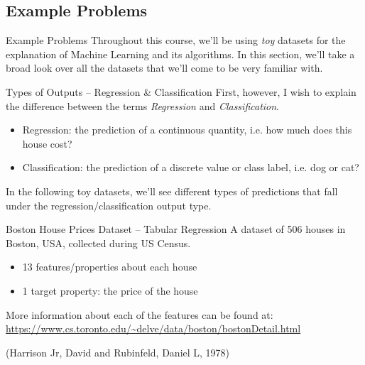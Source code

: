 \documentclass[10pt]{beamer}
\begin{document}
\subsection*{Example Problems}
\label{sec:org822bf43}

\begin{frame}[label={sec:org6674a9a}]{Example Problems}
Throughout this course, we'll be using \emph{toy} datasets for the explanation of Machine
Learning and its algorithms. In this section, we'll take a broad look over all the
datasets that we'll come to be very familiar with.
\end{frame}

\begin{frame}[label={sec:org1bc9d56}]{Types of Outputs -- Regression \& Classification}
First, however, I wish to explain the difference between the terms \emph{Regression} and
\emph{Classification}.

\begin{itemize}
\item Regression: the prediction of a continuous quantity, i.e. how much does this house cost?
\item Classification: the prediction of a discrete value or class label, i.e. dog or cat?
\end{itemize}

In the following toy datasets, we'll see different types of predictions that fall
under the regression/classification output type.
\end{frame}

\begin{frame}[label={sec:org0366c8b}]{Boston House Prices Dataset -- Tabular Regression}
A dataset of 506 houses in Boston, USA, collected during US Census.

\begin{itemize}
\item 13 features/properties about each house
\item 1 target property: the price of the house
\end{itemize}

More information about each of the features can be found at: \url{https://www.cs.toronto.edu/\~delve/data/boston/bostonDetail.html}

(Harrison Jr, David and Rubinfeld, Daniel L, 1978)
\end{frame}
\end{document}
